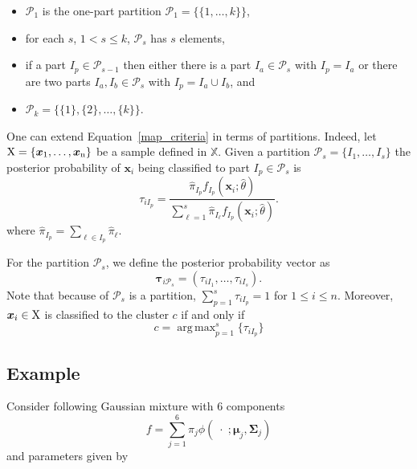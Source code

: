 \documentclass[10pt, a4paper]{article}
\DeclareMathOperator*{\argmax}{arg\,max}
\newcommand{\m}[1]{\boldsymbol{#1}}
\begin{document}
\begin{spacing}{1.9}
\begin{itemize}
\item $\mathcal{P}_1$ is the one-part partition $\mathcal{P}_1 = \{ \{1, \dots, k\} \}$,
\item for each $s$, $1 <  s \leq k$, $\mathcal{P}_{s}$ has $s$ elements,
\item if a part $I_p \in \mathcal{P}_{s-1}$ then either there is a part $I_a \in \mathcal{P}_{s}$ with $I_p = I_a$ or there are two parts $I_a, I_b \in \mathcal{P}_s$ with $I_p = I_a \cup I_b$, and
\item $\mathcal{P}_k= \{ \{1\},\{2\}, \dots, \{k\} \}$.
\end{itemize}



One can extend Equation~\ref{map_criteria} in terms of partitions. Indeed, let $\rm X = \{\m x_1,\dots, \m x_n\}$ be a sample defined in $\mathbb{X}$. Given a partition $\mathcal{P}_s = \{ I_1, \dots, I_s \}$ the posterior probability of $\m x_i$ being classified to part $I_p\in \mathcal{P}_{s}$ is
\[
\tau_{i I_p} =  \frac{ \hat{\pi}_{I_p} f_{I_p}(\m x_i; \hat{\theta}) }{\sum_{\ell=1}^s \hat{\pi}_{I_\ell} f_{I_p}(\m x_i; \hat{\theta})}.
\]
where $\hat{\pi}_{I_p} = \sum_{\ell \in I_p} \hat{\pi}_\ell$. %

For the partition  $\mathcal{P}_s$, we define the posterior probability vector as
\begin{equation}\label{ppv}
\m\tau_{i \mathcal{P}_s} = \left(\tau_{i I_1} , \dots, \tau_{i I_s}  \right).
\end{equation}
Note that because of $\mathcal{P}_s$ is a partition, $\sum_{p=1}^s \tau_{i I_p} = 1$ for $1 \leq i \leq n$.
Moreover, $\m x_i \in \rm X$ is classified to the cluster $c$ if and only if
\begin{equation}\label{cluster_criteria}
c= \argmax_{p=1}^s \{ \tau_{i I_p} \}
\end{equation}

\subsection{Example} \label{example}

Consider following Gaussian mixture with 6 components
\[
f= \sum_{j=1}^6 \pi_j \phi(\;\cdot\; ;  \m\mu_j, \m\Sigma_j)
\]
and parameters given by
{\small  }


\end{spacing}
\end{document}
